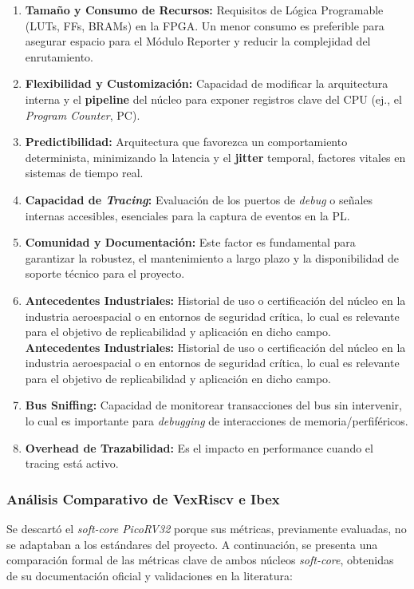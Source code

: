 \begin{enumerate}
    \item \textbf{Tamaño y Consumo de Recursos:} Requisitos de Lógica Programable (LUTs, FFs, BRAMs) en la FPGA. Un menor consumo es preferible para asegurar espacio para el Módulo Reporter y reducir la complejidad del enrutamiento.
    \item \textbf{Flexibilidad y Customización:} Capacidad de modificar la arquitectura interna y el \textbf{pipeline} del núcleo para exponer registros clave del CPU (ej., el \textit{Program Counter}, PC).
    \item \textbf{Predictibilidad:} Arquitectura que favorezca un comportamiento determinista, minimizando la latencia y el \textbf{jitter} temporal, factores vitales en sistemas de tiempo real.
    \item \textbf{Capacidad de \textit{Tracing}:} Evaluación de los puertos de \textit{debug} o señales internas accesibles, esenciales para la captura de eventos en la PL.
    \item \textbf{Comunidad y Documentación:} Este factor es fundamental para garantizar la robustez, el mantenimiento a largo plazo y la disponibilidad de soporte técnico para el proyecto.
     \item \textbf{Antecedentes Industriales:} Historial de uso o certificación del núcleo en la industria aeroespacial o en entornos de seguridad crítica, lo cual es relevante para el objetivo de replicabilidad y aplicación en dicho campo. \textbf{Antecedentes Industriales:} Historial de uso o certificación del núcleo en la industria aeroespacial o en entornos de seguridad crítica, lo cual es relevante para el objetivo de replicabilidad y aplicación en dicho campo.
    \item \textbf{Bus Sniffing:} Capacidad de monitorear transacciones del bus  sin intervenir, lo cual es importante para \textit{debugging} de interacciones de memoria/perfiféricos.
    \item \textbf{Overhead de Trazabilidad:} Es el impacto en performance cuando el tracing está activo. 


\end{enumerate}

\subsubsection{Análisis Comparativo de VexRiscv e Ibex}
Se descartó el \textit{soft-core PicoRV32} porque sus métricas, previamente evaluadas, no se adaptaban a los estándares del proyecto. A continuación, se presenta una comparación formal de las métricas clave de ambos núcleos \textit{soft-core}, obtenidas de su documentación oficial y validaciones en la literatura:

